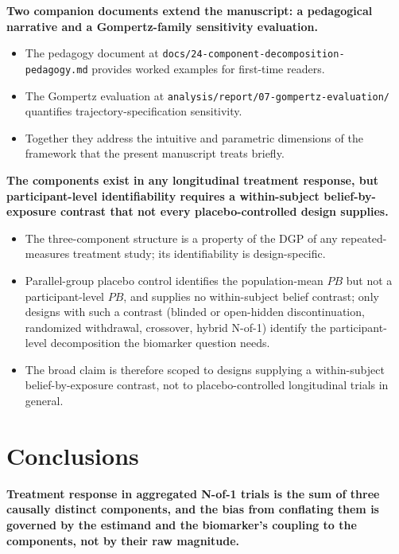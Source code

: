 \documentclass[
  11pt,
]{article}
\begin{document}
\textbf{Two companion documents extend the manuscript: a pedagogical narrative and a Gompertz-family sensitivity evaluation.}

\begin{itemize}\setlength{\itemsep}{2pt}\setlength{\parskip}{0pt}
\item The pedagogy document at \texttt{docs/24-component-decomposition-pedagogy.md} provides worked examples for first-time readers.
\item The Gompertz evaluation at \texttt{analysis/report/07-gompertz-evaluation/} quantifies trajectory-specification sensitivity.
\item Together they address the intuitive and parametric dimensions of the framework that the present manuscript treats briefly.
\end{itemize}

\textbf{The components exist in any longitudinal treatment response, but participant-level identifiability requires a within-subject belief-by-exposure contrast that not every placebo-controlled design supplies.}

\begin{itemize}\setlength{\itemsep}{2pt}\setlength{\parskip}{0pt}
\item The three-component structure is a property of the DGP of any repeated-measures treatment study; its identifiability is design-specific.
\item Parallel-group placebo control identifies the population-mean $PB$ but not a participant-level $PB$, and supplies no within-subject belief contrast; only designs with such a contrast (blinded or open-hidden discontinuation, randomized withdrawal, crossover, hybrid N-of-1) identify the participant-level decomposition the biomarker question needs.
\item The broad claim is therefore scoped to designs supplying a within-subject belief-by-exposure contrast, not to placebo-controlled longitudinal trials in general.
\end{itemize}

\section{Conclusions}\label{conclusions}

\textbf{Treatment response in aggregated N-of-1 trials is the sum of three causally distinct components, and the bias from conflating them is governed by the estimand and the biomarker's coupling to the components, not by their raw magnitude.}
\end{document}
